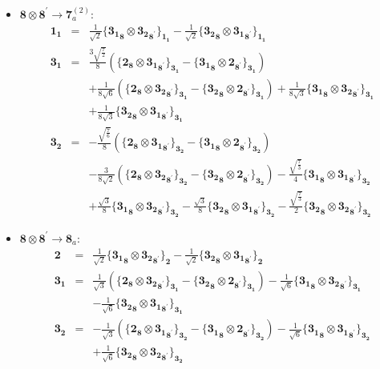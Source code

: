 \documentclass[english]{article}
\newcommand{\subcg}[3]{\big\{ {#1}\otimes{#2}\big\}^{}_{#3}}
\newcommand{\rep}[1]{\mathbf{#1}}
\begin{document}
\begin{itemize}
\begin{eqnarray*}
\end{eqnarray*}
\item $\rep{8}\otimes\rep{8}^{\prime}\to\rep{7}_{a}^{(2)}$:
\begin{eqnarray*}
\rep{1_1} &=& \frac{1}{\sqrt{2}}\subcg{\rep{3_1}_{\rep{8}}}{\rep{3_2}_{\rep{8}^{\prime}}}{\rep{1_1}}-\frac{1}{\sqrt{2}}\subcg{\rep{3_2}_{\rep{8}}}{\rep{3_1}_{\rep{8}^{\prime}}}{\rep{1_1}}
\\
\rep{3_1} &=& \frac{3 \sqrt{\frac{7}{2}}}{8}\left(\subcg{\rep{2}_{\rep{8}}}{\rep{3_1}_{\rep{8}^{\prime}}}{\rep{3_1}}-\subcg{\rep{3_1}_{\rep{8}}}{\rep{2}_{\rep{8}^{\prime}}}{\rep{3_1}}\right) \\ 
 & & +\frac{1}{8 \sqrt{6}}\left(\subcg{\rep{2}_{\rep{8}}}{\rep{3_2}_{\rep{8}^{\prime}}}{\rep{3_1}}-\subcg{\rep{3_2}_{\rep{8}}}{\rep{2}_{\rep{8}^{\prime}}}{\rep{3_1}}\right)+\frac{1}{8 \sqrt{3}}\subcg{\rep{3_1}_{\rep{8}}}{\rep{3_2}_{\rep{8}^{\prime}}}{\rep{3_1}} \\ 
 & & +\frac{1}{8 \sqrt{3}}\subcg{\rep{3_2}_{\rep{8}}}{\rep{3_1}_{\rep{8}^{\prime}}}{\rep{3_1}}
\\
\rep{3_2} &=& -\frac{\sqrt{\frac{7}{6}}}{8}\left(\subcg{\rep{2}_{\rep{8}}}{\rep{3_1}_{\rep{8}^{\prime}}}{\rep{3_2}}-\subcg{\rep{3_1}_{\rep{8}}}{\rep{2}_{\rep{8}^{\prime}}}{\rep{3_2}}\right) \\ 
 & & -\frac{3}{8 \sqrt{2}}\left(\subcg{\rep{2}_{\rep{8}}}{\rep{3_2}_{\rep{8}^{\prime}}}{\rep{3_2}}-\subcg{\rep{3_2}_{\rep{8}}}{\rep{2}_{\rep{8}^{\prime}}}{\rep{3_2}}\right)-\frac{\sqrt{\frac{7}{3}}}{4}\subcg{\rep{3_1}_{\rep{8}}}{\rep{3_1}_{\rep{8}^{\prime}}}{\rep{3_2}} \\ 
 & & +\frac{\sqrt{3}}{8}\subcg{\rep{3_1}_{\rep{8}}}{\rep{3_2}_{\rep{8}^{\prime}}}{\rep{3_2}}-\frac{\sqrt{3}}{8}\subcg{\rep{3_2}_{\rep{8}}}{\rep{3_1}_{\rep{8}^{\prime}}}{\rep{3_2}}-\frac{\sqrt{\frac{7}{3}}}{2}\subcg{\rep{3_2}_{\rep{8}}}{\rep{3_2}_{\rep{8}^{\prime}}}{\rep{3_2}}
\end{eqnarray*}
\item $\rep{8}\otimes\rep{8}^{\prime}\to\rep{8}_{a}$:
\begin{eqnarray*}
\rep{2} &=& \frac{1}{\sqrt{2}}\subcg{\rep{3_1}_{\rep{8}}}{\rep{3_2}_{\rep{8}^{\prime}}}{\rep{2}}-\frac{1}{\sqrt{2}}\subcg{\rep{3_2}_{\rep{8}}}{\rep{3_1}_{\rep{8}^{\prime}}}{\rep{2}}
\\
\rep{3_1} &=& \frac{1}{\sqrt{3}}\left(\subcg{\rep{2}_{\rep{8}}}{\rep{3_2}_{\rep{8}^{\prime}}}{\rep{3_1}}-\subcg{\rep{3_2}_{\rep{8}}}{\rep{2}_{\rep{8}^{\prime}}}{\rep{3_1}}\right)-\frac{1}{\sqrt{6}}\subcg{\rep{3_1}_{\rep{8}}}{\rep{3_2}_{\rep{8}^{\prime}}}{\rep{3_1}} \\ 
 & & -\frac{1}{\sqrt{6}}\subcg{\rep{3_2}_{\rep{8}}}{\rep{3_1}_{\rep{8}^{\prime}}}{\rep{3_1}}
\\
\rep{3_2} &=& -\frac{1}{\sqrt{3}}\left(\subcg{\rep{2}_{\rep{8}}}{\rep{3_1}_{\rep{8}^{\prime}}}{\rep{3_2}}-\subcg{\rep{3_1}_{\rep{8}}}{\rep{2}_{\rep{8}^{\prime}}}{\rep{3_2}}\right)-\frac{1}{\sqrt{6}}\subcg{\rep{3_1}_{\rep{8}}}{\rep{3_1}_{\rep{8}^{\prime}}}{\rep{3_2}} \\ 
 & & +\frac{1}{\sqrt{6}}\subcg{\rep{3_2}_{\rep{8}}}{\rep{3_2}_{\rep{8}^{\prime}}}{\rep{3_2}}
\end{eqnarray*}
\end{itemize}
\end{document}
